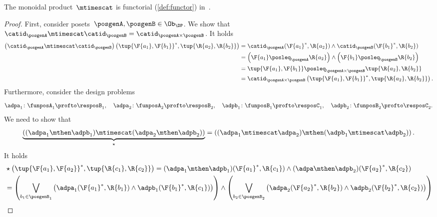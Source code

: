 \begin{lemma}
    \label{lem:monoidal_functorial}
    The monoidal product~$\mtimescat$ is functorial (\cref{def:functor}) in~\DP.
\end{lemma}
\begin{proof}
    First, consider posets~$\posgenA,\posgenB\in \Ob_\DP$. We show that~$\catid_\posgenA\mtimescat \catid_\posgenB = \catid_{\posgenA\times \posgenB}$. It holds
    \begin{equation}
        \begin{aligned}
            \left( \catid_{\posgenA}\mtimescat \catid_{\posgenB}\right)
            \left( \tup{\F{a_1},\F{b_1}}^*,\tup{\R{a_2},\R{b_2}}\right)&=
            \catid_\posgenA(\F{a_1}^*,\R{a_2})\wedge \catid_\posgenB(\F{b_1}^*,\R{b_2})\\
            &=\left( \F{a_1}\posleq_\posgenA \R{a_2}\right)\wedge \left( \F{b_1}\posleq_\posgenB \R{b_2}\right)\\
            &=\tup{\F{a_1},\F{b_1}}\posleq_{\posgenA\times \posgenB}\tup{\R{a_2},\R{b_2}}\\
            &=\catid_{\posgenA\times \posgenB}\left( \tup{\F{a_1},\F{b_1}}^*,\tup{\R{a_2},\R{b_2}}\right).
        \end{aligned}
    \end{equation}
    Furthermore, consider the design problems
    \begin{equation*}
        \adpa_1\colon \funposA_1 \profto \resposB_1,\quad \adpa_2\colon \funposA_2\profto \resposB_2, \quad \adpb_1\colon \funposB_1\profto \resposC_1,\quad \adpb_2\colon \funposB_2\profto \resposC_2.
    \end{equation*}
    We need to show that
    \begin{equation}
        \underbrace{\left( (\adpa_1\mthen \adpb_1) \mtimescat (\adpa_2\mthen \adpb_2)\right)}_{\star}=\left( (\adpa_1\mtimescat \adpa_2)\mthen (\adpb_1\mtimescat \adpb_2)\right).
    \end{equation}
    It holds
    \begin{equation}
        \begin{aligned}
            &\star \left( \tup{\F{a_1},\F{a_2}}^*,\tup{\R{c_1},\R{c_2}}\right)=(\adpa_1\mthen \adpb_1)(\F{a_1}^*,\R{c_1})\wedge (\adpa\mthen \adpb_2)(\F{a_2}^*,\R{c_2})\\
            &=\left(\bigvee_{b_1\in \posgenB_1}\left( \adpa_1(\F{a_1}^*,\R{b_1})\wedge \adpb_1(\F{b_1}^*,\R{c_1})\right)\right) \wedge\left(\bigvee_{b_2\in \posgenB_2}\left( \adpa_2(\F{a_2}^*,\R{b_2})\wedge \adpb_2(\F{b_2}^*,\R{c_2})\right)\right)\\

\end{aligned}
\end{equation}
\end{proof}
